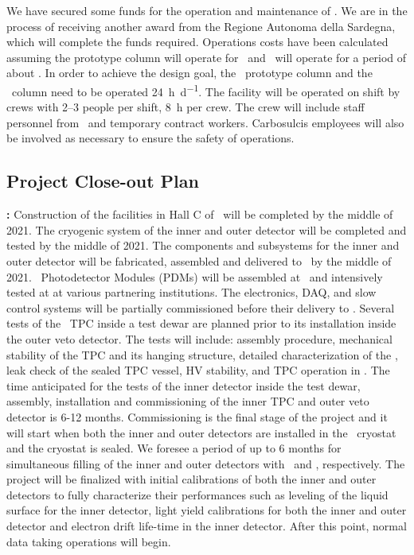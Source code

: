 We have secured some funds for the operation and maintenance of \Aria. We are in the process of receiving another award from the Regione Autonoma della Sardegna, which will complete the funds required.  Operations costs have been calculated assuming the prototype column will operate for \AriaSeruciZeroOperationPeriod\ and \SeruciOne\ will operate for a period of about \AriaSeruciOneOperationPeriod.  In order to achieve the design goal, the \SeruciZero\ prototype column and the \SeruciOne\ column need to be operated \SI{24}{\hour\per\day}. The facility will be operated on shift by crews with \numrange{2}{3} people per shift, \SI{8}{\hour} per crew. The crew will include staff personnel from \INFN\ and temporary contract workers. Carbosulcis employees will also be involved as necessary to ensure the safety of operations.

\subsection{Project Close-out Plan}

\textbf{\DSks:}  Construction of the facilities in Hall C of \LNGS\ will be completed by the middle of 2021.  The cryogenic system of the inner and outer detector will be completed and tested by the middle of 2021. The components and subsystems for the inner and outer detector will be fabricated, assembled and delivered to \LNGS\ by the middle of 2021. \DSks\ Photodetector Modules (PDMs) will be assembled at \NOA\ and intensively tested at at various partnering institutions. The electronics, DAQ, and slow control systems will be partially commissioned before their delivery to \LNGS. Several tests of the \DSks\ TPC inside a test dewar are planned prior to its installation inside the outer veto detector. The tests will include: assembly procedure, mechanical stability of the TPC and its hanging structure, detailed characterization of the \SiPMs, leak check of the sealed TPC vessel, HV stability, and TPC operation in \LAr. The time anticipated for the tests of the inner detector inside the test dewar, assembly, installation and commissioning of the inner TPC and outer veto detector is 6-12 months. Commissioning is the final stage of the project and it will start when both the inner and outer detectors are installed in the \AAr\ cryostat and the cryostat is sealed. We foresee a period of up to 6 months for simultaneous filling of the inner and outer detectors with \UAr\ and \AAr, respectively. The project will be finalized with initial calibrations of both the inner and outer detectors to fully characterize their performances such as leveling of the liquid surface for the inner detector, light yield calibrations for both the inner and outer detector and electron drift life-time in the inner detector. After this point, normal data taking operations will begin.

